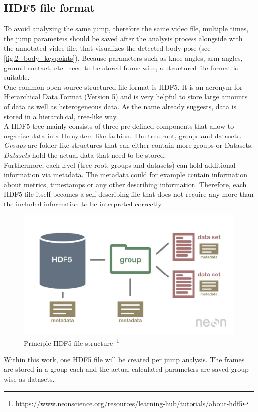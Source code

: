 \subsection{HDF5 file format}\label{subsec:2_hdf5}
To avoid analyzing the same jump, therefore the same video file, multiple 
times, the jump parameters should be saved after the analysis process alongside
with the annotated video file, that visualizes the detected body pose (see
\autoref{fig:2_body_keypoints}).
Because parameters such as knee angles, arm angles, ground contact, etc.\ need 
to be stored frame-wise, a structured file format is suitable.\\
One common open source structured file format is HDF5.
It is an acronym for Hierarchical Data Format (Version 5) and is very helpful 
to store large amounts of data as well as heterogeneous data. 
As the name already suggests, data is stored in a hierarchical, tree-like way.\\
A HDF5 tree mainly consists of three pre-defined components that allow to 
organize data in a file-system like fashion.
The tree root, groups and datasets.
\textit{Groups} are folder-like structures that can either contain more groups 
or Datasets.
\textit{Datasets} hold the actual data that need to be stored.\\
Furthermore, each level (tree root, groups and datasets) can hold additional 
information via metadata.
The metadata could for example contain information about metrics, timestamps or 
any other describing information.
Therefore, each HDF5 file itself becomes a self-describing file that does not
require any more than the included information to be interpreted correctly.\\
\begin{figure}[!h]
    \centering
    \includegraphics[scale=0.24]{figures/hdf5_general_structure.jpg}
    \caption[HDF5 file structure]
    {Principle HDF5 file structure~\footnote{
        \url{https://www.neonscience.org/resources/learning-hub/tutorials/about-hdf5}}}
    \label{fig:2_principle_hdf5_structure}
\end{figure}
\FloatBarrier
\noindent Within this work, one HDF5 file will be created per jump analysis.
The frames are stored in a group each and the actual calculated parameters are 
saved group-wise as datasets.

